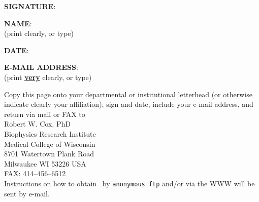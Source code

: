 {\bf SIGNATURE}:\vspace{2ex}


{\bf NAME}:\\
(print clearly, or type)\vspace{2ex}

{\bf DATE}:\vspace{2ex}

{\bf E-MAIL ADDRESS}:\\
(print \underline{\bf very} clearly, or type)\vspace{0.5ex}

Copy this page onto your departmental or institutional letterhead
(or otherwise indicate clearly your affiliation),
sign and date, include your e-mail address, and return via mail or FAX to\\[.5ex]
\hspace*{3em} Robert W. Cox, PhD \\
\hspace*{3em} Biophysics Research Institute \\
\hspace*{3em} Medical College of Wisconsin \\
\hspace*{3em} 8701 Watertown Plank Road \\
\hspace*{3em} Milwaukee WI 53226 USA\\[0.5ex]
\hspace*{3em} FAX: 414--456--6512 \\[0.5ex]
Instructions on how to obtain \MCW$\!$~\afnit by {\tt anonymous ftp} and/or via the WWW
will be sent by e-mail.



